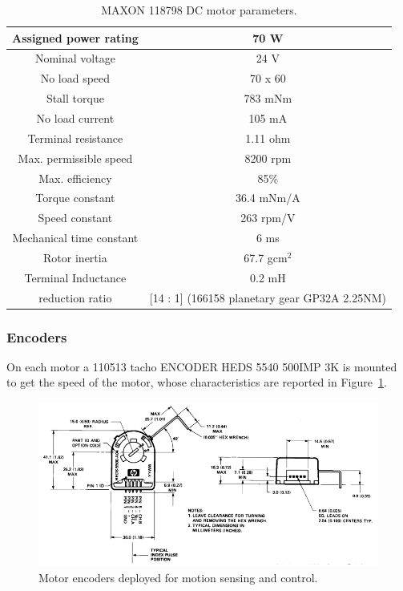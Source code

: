 \begin{table}[h]
	\begin{center}
		\begin{tabular}{|c|c|}
			\hline
			Assigned power rating &  70 W \\
			\hline
			Nominal voltage & 24 V \\
			\hline
			No load speed & 70 x 60  \\
			\hline
			Stall torque & 783 mNm \\
			\hline
			No load current & 105 mA \\ 
			\hline
			Terminal resistance & 1.11 ohm \\
			\hline 
			Max. permissible speed & 8200 rpm \\
			\hline
			Max. efficiency &  85\% \\
			\hline
			Torque constant & 36.4 mNm/A \\
			\hline
			Speed constant & 263 rpm/V \\
			\hline
			Mechanical time constant & 6 ms \\
			\hline 
			Rotor inertia & 67.7 gcm$^2$ \\
			\hline
			Terminal Inductance & 0.2 mH \\
			\hline  
			reduction ratio & [14 : 1] (166158 planetary gear GP32A 2.25NM) \\
			\hline 
		\end{tabular}
	\end{center}
	\caption{MAXON 118798 DC motor parameters.}
    \label{maxon}
\end{table}

\subsubsection{Encoders}
On each motor a 110513 tacho ENCODER HEDS 5540 500IMP 3K is mounted to get the speed of the motor, whose characteristics are reported in Figure~\ref{enc}.

\begin{figure}[h]
	\centering
	\includegraphics[width=\textwidth]{images/03-foundation/enc}
	\caption{Motor encoders deployed for motion sensing and control.}
	\label{enc} 
\end{figure}

